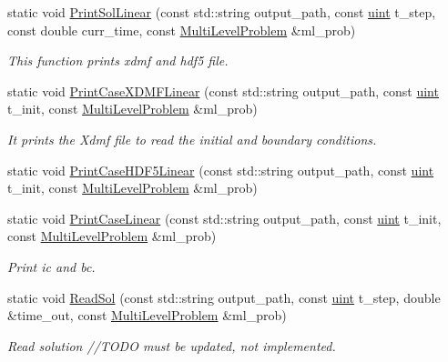 \begin{DoxyCompactItemize}
$$static void \mbox{\hyperlink{classfemus_1_1_x_d_m_f_writer_a192252d5f9ace15cb9cd62268ab7ff7f}{Print\+Sol\+Linear}} (const std\+::string output\+\_\+path, const \mbox{\hyperlink{_typedefs_8hpp_a91ad9478d81a7aaf2593e8d9c3d06a14}{uint}} t\+\_\+step, const double curr\+\_\+time, const \mbox{\hyperlink{classfemus_1_1_multi_level_problem}{Multi\+Level\+Problem}} \&ml\+\_\+prob)
\begin{DoxyCompactList}\small\item\em This function prints xdmf and hdf5 file. \end{DoxyCompactList}\item 
static void \mbox{\hyperlink{classfemus_1_1_x_d_m_f_writer_adb7f2e11872687f2ec8d7293e6123afe}{Print\+Case\+X\+D\+M\+F\+Linear}} (const std\+::string output\+\_\+path, const \mbox{\hyperlink{_typedefs_8hpp_a91ad9478d81a7aaf2593e8d9c3d06a14}{uint}} t\+\_\+init, const \mbox{\hyperlink{classfemus_1_1_multi_level_problem}{Multi\+Level\+Problem}} \&ml\+\_\+prob)
\begin{DoxyCompactList}\small\item\em It prints the Xdmf file to read the initial and boundary conditions. \end{DoxyCompactList}\item 
static void \mbox{\hyperlink{classfemus_1_1_x_d_m_f_writer_a3eee94cc377569e0284241a7e91110e6}{Print\+Case\+H\+D\+F5\+Linear}} (const std\+::string output\+\_\+path, const \mbox{\hyperlink{_typedefs_8hpp_a91ad9478d81a7aaf2593e8d9c3d06a14}{uint}} t\+\_\+init, const \mbox{\hyperlink{classfemus_1_1_multi_level_problem}{Multi\+Level\+Problem}} \&ml\+\_\+prob)
\item 
static void \mbox{\hyperlink{classfemus_1_1_x_d_m_f_writer_ab75b676d35a4f411608e45ef578d3c7e}{Print\+Case\+Linear}} (const std\+::string output\+\_\+path, const \mbox{\hyperlink{_typedefs_8hpp_a91ad9478d81a7aaf2593e8d9c3d06a14}{uint}} t\+\_\+init, const \mbox{\hyperlink{classfemus_1_1_multi_level_problem}{Multi\+Level\+Problem}} \&ml\+\_\+prob)
\begin{DoxyCompactList}\small\item\em Print ic and bc. \end{DoxyCompactList}\item 
static void \mbox{\hyperlink{classfemus_1_1_x_d_m_f_writer_a81c3afaed501b810d42927539387b108}{Read\+Sol}} (const std\+::string output\+\_\+path, const \mbox{\hyperlink{_typedefs_8hpp_a91ad9478d81a7aaf2593e8d9c3d06a14}{uint}} t\+\_\+step, double \&time\+\_\+out, const \mbox{\hyperlink{classfemus_1_1_multi_level_problem}{Multi\+Level\+Problem}} \&ml\+\_\+prob)
\begin{DoxyCompactList}\small\item\em Read solution //\+T\+O\+DO must be updated, not implemented. \end{DoxyCompactList}\end{DoxyCompactItemize}
